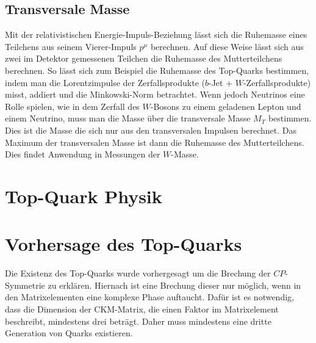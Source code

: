 \subsection{Transversale Masse}
Mit der relativistischen Energie-Impuls-Beziehung lässt sich die Ruhemasse eines Teilchens aus seinem Vierer-Impuls $p^\mu$ berechnen. Auf diese Weise lässt sich aus zwei im Detektor gemessenen Teilchen die Ruhemasse des Mutterteilchens berechnen. So lässt sich zum Beispiel die Ruhemasse des Top-Quarks bestimmen, indem man die Lorentzimpulse der Zerfallsprodukte ($b$-Jet + $W$-Zerfallsprodukte) misst, addiert und die Minkowski-Norm betrachtet. Wenn jedoch Neutrinos eine Rolle spielen, wie in dem Zerfall des $W$-Bosons zu einem geladenen Lepton und einem Neutrino, muss man die Masse über die transversale Masse $M_T$ bestimmen. Dies ist die Masse die sich nur aus den transversalen Impulsen berechnet. Das Maximum der transversalen Masse ist dann die Ruhemasse des Mutterteilchens. Dies findet Anwendung in Messungen der $W$-Masse.
\section{Top-Quark Physik}
\section{Vorhersage des Top-Quarks}
Die Existenz des Top-Quarks wurde vorhergesagt um die Brechung der $CP$-Symmetrie zu erklären. Hiernach ist eine Brechung dieser nur möglich, wenn in den Matrixelementen eine komplexe Phase auftaucht. Dafür ist es notwendig, dass die Dimension der CKM-Matrix, die einen Faktor im Matrixelement beschreibt, mindestens drei beträgt. Daher muss mindestens eine dritte Generation von Quarks existieren\cite{KOBAYASHI1989199}. 
 
